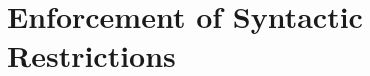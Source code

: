 \makeatletter{}\documentclass[10pt,oneside]{book}
\let\oldmarginpar\marginpar
\renewcommand\marginpar[1]{\-\oldmarginpar[\raggedleft\footnotesize #1]%
{\raggedright\footnotesize #1}}
\newcounter{parnum}[section]
\newcommand{\N}{\addtocounter{parnum}{1}\marginpar{\quad\arabic{chapter}.\arabic{section}(\arabic{parnum})}}
\newcommand{\nonterminal}[1]{{\slantsf #1}}
\theoremstyle{note}
\newtheorem{definition}{Definition}[section]
\newcommand{\avik}[1]{\textcolor{RoyalBlue}{{\bf Avik:} #1}}
\begin{document}





 

\makeatletter{}
\section{Enforcement of Syntactic Restrictions}\label{sec:syntax-restrictions}
\end{document}
